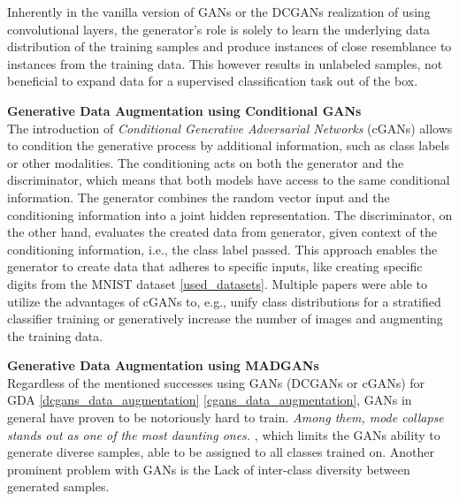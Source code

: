 Inherently in the vanilla version of GANs or the DCGANs realization of using convolutional layers, the generator's role is solely to learn the underlying data distribution of the training samples and produce instances of close resemblance to instances from the training data. This however results in unlabeled samples, not beneficial to expand data for a supervised classification task out of the box.

\noindent\textbf{Generative Data Augmentation using Conditional GANs}\label{cgans_data_augmentation} \\
The introduction of \textit{Conditional Generative Adversarial Networks} (cGANs) \cite{mirza2014conditionalgenerativeadversarialnets} allows to condition the generative process by additional information, such as class labels or other modalities. The conditioning acts on both the generator and the discriminator, which means that both models have access to the same conditional information. The generator combines the random vector input and the conditioning information into a joint hidden representation. The discriminator, on the other hand, evaluates the created data from generator, given context of the conditioning information, i.e., the class label passed. This approach enables the generator to create data that adheres to specific inputs, like creating specific digits from the MNIST dataset \ref{used_datasets}. Multiple papers were able to utilize the advantages of cGANs to, e.g., unify class distributions for a stratified classifier training or generatively increase the number of images and augmenting the training data\cite{jeong2022gan}\cite{zhao2023gan}\cite{cGANGDA2025asurveyreview}\cite{wickramaratne2021conditional}.

\noindent\textbf{Generative Data Augmentation using MADGANs}\label{madgans_data_augmentation} \\
Regardless of the mentioned successes using GANs (DCGANs or cGANs) for GDA \ref{dcgans_data_augmentation} \ref{cgans_data_augmentation}, GANs in general have proven to be notoriously hard to train. \textit{Among them, mode collapse stands out as one of the most daunting ones.} \cite{durall2020combatingmodecollapsegan}, which limits the GANs ability to generate diverse samples, able to be assigned to all classes trained on. Another prominent problem with GANs is the Lack of inter-class diversity between generated samples.

